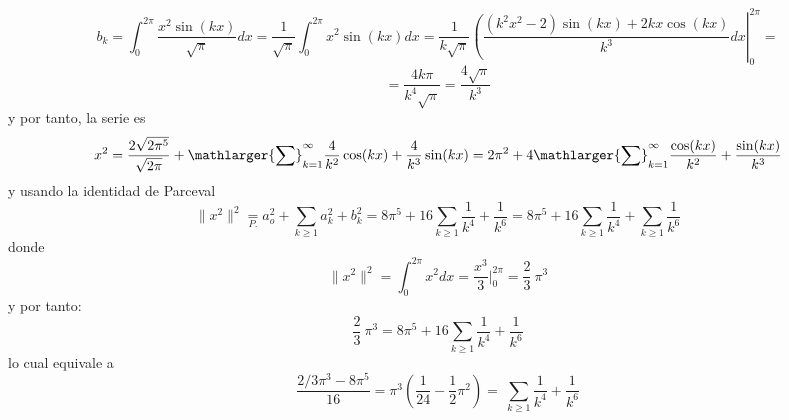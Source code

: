 \begin{enumerate}
\begin{sol}
            $$b_k=\int_0^{2 \pi}  \dfrac{x^2 \sin(kx)}{\sqrt{\pi}} dx = \dfrac{1}{\sqrt{\pi}} \int_0^{2 \pi}  x^2 \sin(kx) dx = \dfrac{1}{k \sqrt{\pi}} \left( \dfrac{(k^2 x^2 - 2) \sin(k x) + 2 k x \cos(k x)}{k^3}dx\right|_0^{2\pi}=$$
            $$=\dfrac{4k\pi}{k^4\sqrt{\pi}}=\dfrac{4\sqrt{\pi}}{k^3}$$
            y por tanto, la serie es 
            $$x^2=\dfrac{2\sqrt{2\pi^5}}{\sqrt{2\pi}} + \mathlarger{\sum}_{k=1}^{\infty} \dfrac{4}{k^2} \cos(kx) + \dfrac{4}{k^3} \sin(kx)= 2\pi^2 + 4 \mathlarger{\sum}_{k=1}^{\infty} \dfrac{\cos(kx)}{k^2} + \dfrac{\sin(kx)}{k^3}$$
            y usando la identidad de Parceval
            $$\|x^2\|^2\underset{P.}{=}a_o^2 + \sum_{k\geq 1} a_k^2 + b_k^2 = 8\pi^5 + 16 \sum_{k\geq 1} \dfrac{1}{k^4} + \dfrac{1}{k^6} =8\pi^5 + 16 \sum_{k\geq 1} \dfrac{1}{k^4} + \sum_{k\geq 1} \dfrac{1}{k^6} $$
            donde 
            $$\|x^2\|^2=\int_0^{2\pi} x^2 dx= \dfrac{x^3}{3} \Big|_0^{2\pi}=\dfrac{2}{3} \: \pi^3$$
            y por tanto:
            $$\dfrac{2}{3} \: \pi^3= 8\pi^5 + 16 \sum_{k\geq 1} \dfrac{1}{k^4} + \dfrac{1}{k^6}$$
            lo cual equivale a 
            $$\dfrac{2/3\pi^3- 8\pi^5}{16}=\pi^3\left(\dfrac{1}{24}-\dfrac{1}{2}\pi^2\right)= \: \sum_{k\geq 1} \dfrac{1}{k^4} + \dfrac{1}{k^6} $$
            

\end{sol}
\end{enumerate}
